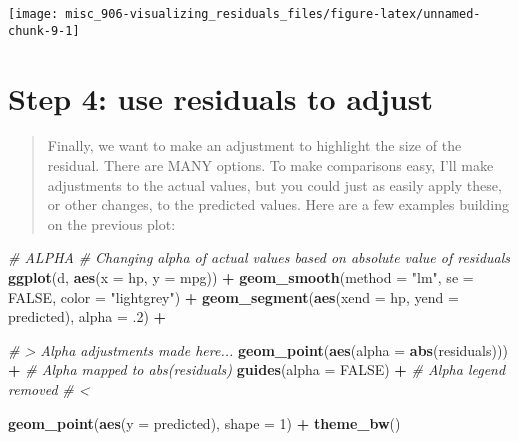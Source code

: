 \documentclass[]{book}
\newenvironment{Shaded}{\begin{snugshade}}{\end{snugshade}}
\newcommand{\CommentTok}[1]{\textcolor[rgb]{0.56,0.35,0.01}{\textit{#1}}}
\newcommand{\DataTypeTok}[1]{\textcolor[rgb]{0.13,0.29,0.53}{#1}}
\newcommand{\DecValTok}[1]{\textcolor[rgb]{0.00,0.00,0.81}{#1}}
\newcommand{\FloatTok}[1]{\textcolor[rgb]{0.00,0.00,0.81}{#1}}
\newcommand{\KeywordTok}[1]{\textcolor[rgb]{0.13,0.29,0.53}{\textbf{#1}}}
\newcommand{\NormalTok}[1]{#1}
\newcommand{\OperatorTok}[1]{\textcolor[rgb]{0.81,0.36,0.00}{\textbf{#1}}}
\newcommand{\OtherTok}[1]{\textcolor[rgb]{0.56,0.35,0.01}{#1}}
\newcommand{\StringTok}[1]{\textcolor[rgb]{0.31,0.60,0.02}{#1}}
\begin{document}
\begin{center}\texttt{[image: misc\_906-visualizing\_residuals\_files/figure-latex/unnamed-chunk-9-1]} \end{center}

\hypertarget{step-4-use-residuals-to-adjust}{%
\section{Step 4: use residuals to adjust}\label{step-4-use-residuals-to-adjust}}

\begin{quote}
Finally, we want to make an adjustment to highlight the size of the residual. There are MANY options. To make comparisons easy, I'll make adjustments to the actual values, but you could just as easily apply these, or other changes, to the predicted values. Here are a few examples building on the previous plot:
\end{quote}

\begin{Shaded}
\begin{Highlighting}[]


\CommentTok{# ALPHA}
\CommentTok{# Changing alpha of actual values based on absolute value of residuals}
\KeywordTok{ggplot}\NormalTok{(d, }\KeywordTok{aes}\NormalTok{(}\DataTypeTok{x =}\NormalTok{ hp, }\DataTypeTok{y =}\NormalTok{ mpg)) }\OperatorTok{+}
\StringTok{  }\KeywordTok{geom_smooth}\NormalTok{(}\DataTypeTok{method =} \StringTok{"lm"}\NormalTok{, }\DataTypeTok{se =} \OtherTok{FALSE}\NormalTok{, }\DataTypeTok{color =} \StringTok{"lightgrey"}\NormalTok{) }\OperatorTok{+}
\StringTok{  }\KeywordTok{geom_segment}\NormalTok{(}\KeywordTok{aes}\NormalTok{(}\DataTypeTok{xend =}\NormalTok{ hp, }\DataTypeTok{yend =}\NormalTok{ predicted), }\DataTypeTok{alpha =} \FloatTok{.2}\NormalTok{) }\OperatorTok{+}

\StringTok{  }\CommentTok{# > Alpha adjustments made here...}
\StringTok{  }\KeywordTok{geom_point}\NormalTok{(}\KeywordTok{aes}\NormalTok{(}\DataTypeTok{alpha =} \KeywordTok{abs}\NormalTok{(residuals))) }\OperatorTok{+}\StringTok{  }\CommentTok{# Alpha mapped to abs(residuals)}
\StringTok{  }\KeywordTok{guides}\NormalTok{(}\DataTypeTok{alpha =} \OtherTok{FALSE}\NormalTok{) }\OperatorTok{+}\StringTok{  }\CommentTok{# Alpha legend removed}
\StringTok{  }\CommentTok{# <}

\StringTok{  }\KeywordTok{geom_point}\NormalTok{(}\KeywordTok{aes}\NormalTok{(}\DataTypeTok{y =}\NormalTok{ predicted), }\DataTypeTok{shape =} \DecValTok{1}\NormalTok{) }\OperatorTok{+}
\StringTok{  }\KeywordTok{theme_bw}\NormalTok{()}
\end{Highlighting}
\end{Shaded}
\end{document}
